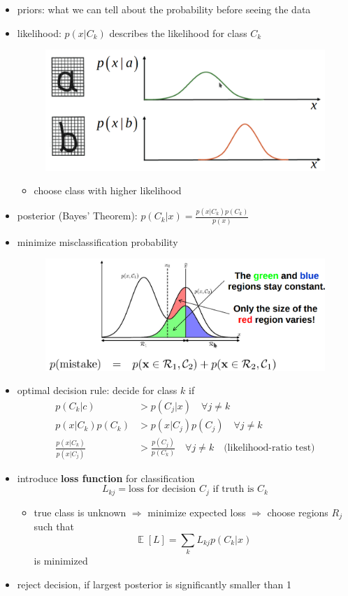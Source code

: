 \documentclass{article}
\DeclareMathOperator*{\E}{\mathbb{E}}
\renewcommand{\emph}[1]{\textbf{#1}}
\begin{document}
\begin{itemize}
  \item priors: what we can tell about the probability before seeing the data
  \item likelihood: $p(x|C_k)$ describes the likelihood for class $C_k$

  \begin{figure}[H]
    \centering
    \includegraphics[width=.5\textwidth]{bayes_likelihood1.png}
  \end{figure}

  \begin{itemize}
    \item choose class with higher likelihood
  \end{itemize}

  \item posterior (Bayes' Theorem): $p(C_k|x) = \frac{p(x|C_k)p(C_k)}{p(x)}$
  \item minimize misclassification probability

  \begin{figure}[H]
    \centering
    \includegraphics[width=.5\textwidth]{bayes_misclassification}
  \end{figure}

  \item optimal decision rule: decide for class $k$ if
  \begin{align*}
    p(C_k|c) &> p(C_j|x) \quad \forall j \not = k \\
    p(x|C_k)p(C_k) &> p(x|C_j)p(C_j) \quad \forall j \not = k \\
    \frac{p(x|C_k)}{p(x|C_j)} &> \frac{p(C_j)}{p(C_k)} \quad \forall j \not = k \quad \text{(likelihood-ratio test)}
  \end{align*}

  \item introduce \emph{loss function} for classification \[
    L_{kj} = \text{loss for decision $C_j$ if truth is $C_k$}
  \]
  \begin{itemize}
    \item true class is unknown $\Rightarrow$ minimize expected loss $\Rightarrow$ choose regions $R_j$ such that \[
      \E[L] = \sum_k L_{kj} p(C_k | x)
    \]
    is minimized
  \end{itemize}
  \item reject decision, if largest posterior is significantly smaller than 1
  \end{itemize}
\end{document}
